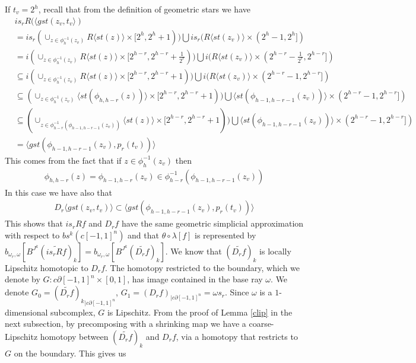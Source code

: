 \documentclass[a4paper,11pt]{article}
\theoremstyle{definition}
\theoremstyle{plain}
\theoremstyle{remark}
\begin{document}
{If $t_{v}=2^h$, recall that from the definition of geometric stars we have
\begin{align*}
&is_{r}R (\langle gst(z_{v},t_{v}\rangle) \\
&= is_{r}(\cup_{z\in \phi_{h}^{-1}(z_{v})} R \langle st(z) \rangle \times [2^h, 2^h+1)) \bigcup is_{r} (R\langle st(z_{v})\rangle \times (2^{h}-1,2^h])\\
&=i(\cup_{z\in \phi_{h}^{-1}(z_{v})} R \langle st(z) \rangle \times [2^{h-r}, 2^{h-r}+\frac{1}{2^r})) \bigcup i (R\langle st(z_{v})\rangle \times (2^{h-r}-\frac{1}{2^r},2^{h-r}])\\
&\subseteq i(\cup_{z\in \phi_{h}^{-1}(z_{v})} R \langle st(z) \rangle \times [2^{h-r}, 2^{h-r}+1)) \bigcup i (R\langle st(z_{v})\rangle \times (2^{h-r}-1,2^{h-r}])\\
&\subseteq (\cup_{z\in \phi_{h}^{-1}(z_{v})}  \langle st(\phi_{h,h-r}(z)) \rangle \times [2^{h-r}, 2^{h-r}+1)) \bigcup \langle st(\phi_{h-1,h-r-1} (z_{v}))\rangle \times (2^{h-r}-1,2^{h-r}])\\
&\subseteq (\cup_{z\in \phi_{h-r}^{-1}(\phi_{h-1,h-r-1}(z_{v}))}  \langle st(z) \rangle \times [2^{h-r}, 2^{h-r}+1)) \bigcup \langle st(\phi_{h-1,h-r-1} (z_{v}))\rangle \times (2^{h-r}-1,2^{h-r}])\\
&= \langle gst(\phi_{h-1,h-r-1}(z_{v}), p_{r}(t_{v}))\rangle 
\end{align*} 
This comes from the fact that if $z\in \phi_{h}^{-1}(z_v)$ then  
\begin{align*}
\phi_{h,h-r}(z)=\phi_{h-1,h-r}(z_{v})\in \phi_{h-r}^{-1}(\phi_{h-1,h-r-1}(z_v))
\end{align*}
In this case we have also that 
\begin{align*}
D_{r}\langle gst(z_{v},t_{v})\rangle \subset \langle gst(\phi_{h-1,h-r-1}(z_{v}),p_{r}(t_{v})) \rangle  
\end{align*}
This shows that $is_{r}Rf$ and $D_{r}f$ have the same geometric simplicial approximation with respect to $bs^{k}(c[-1,1]^n)$ and that $\theta\circ \lambda[f]$ is represented by $b_{\omega_{r},\omega}[B^{J^{k}}(\widetilde{is_{r}Rf})_{k}] = b_{\omega_r,\omega} [B^{J^{k}}(\widetilde{D_{r}f})_{k}]$. We know that $(\widetilde{D_{r}f})_{k}$ is locally Lipschitz homotopic to $D_{r}f$. The homotopy restricted to the boundary, which we denote by $G: c\partial [-1,1]^n \times [0,1]$, has image contained in the base ray $\omega$. We denote $G_{0}= {(\widetilde{D_{r}f})_{k}}_{|c\partial[-1,1]^n}$, $G_1 = (D_{r}f)_{|c\partial [-1,1]^n}= \omega s_{r}$. Since $\omega$ is a $1$-dimensional subcomplex, $G$ is Lipschitz. From the proof of Lemma \ref{clip} in the next subsection, by precomposing with a shrinking map we have a coarse-Lipschitz homotopy between $(\widetilde{D_{r}f})_{k}$  and $D_{r}f$, via a homotopy that restricts to $G$ on the boundary. This gives us
}
\end{document}
